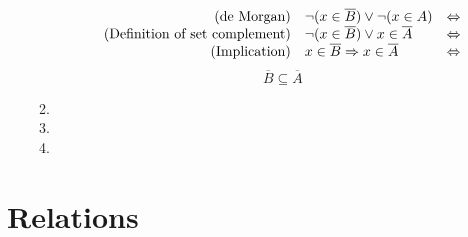 \documentclass{article}
\begin{document}
\begin{enumerate}
\begin{enumerate}
$$\begin{array}{r l l}
                    \text{(de Morgan)} &\lnot(x \in \overline{B}) \lor \lnot(x \in A) & \Leftrightarrow \\
                    \text{(Definition of set complement)} &\lnot(x \in \overline{B}) \lor x \in \overline{A} & \Leftrightarrow \\
                    \text{(Implication)} & x \in \overline{B} \Rightarrow x \in \overline{A} & \Leftrightarrow \\
                \end{array}$$
                $$\overline{B} \subseteq \overline{A}$$
            \item
            \item
            \item
        \end{enumerate}
\end{enumerate}

\section{Relations}
    
\end{document}
